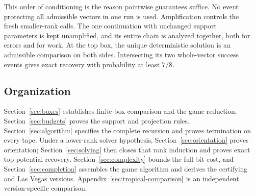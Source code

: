 This order of conditioning is the reason pointwise guarantees suffice.
No event protecting all admissible vectors in one run is used.
Amplification controls the fresh smaller-rank calls. The one continuation
with unchanged support parameters is kept unamplified, and its entire
chain is analyzed together, both for errors and for work. At the top
box, the unique deterministic solution is an admissible comparison on
both sides. Intersecting its two whole-vector success events gives
exact recovery with probability at least $7/8$.

\subsection{Organization}

Section~\ref{sec:boxes} establishes finite-box comparison and the game
reduction. Section~\ref{sec:budgets} proves the support and projection
rules. Section~\ref{sec:algorithm} specifies the complete recursion and
proves termination on every tape. Under a lower-rank solver hypothesis,
Section~\ref{sec:orientation} proves orientation; Section~\ref{sec:solving}
then closes that rank induction and proves exact top-potential recovery.
Section~\ref{sec:complexity} bounds the full bit cost, and
Section~\ref{sec:completion} assembles the game algorithm and derives
the certifying and Las Vegas versions.
Appendix~\ref{sec:tropical-comparison} is an independent version-specific
comparison.
